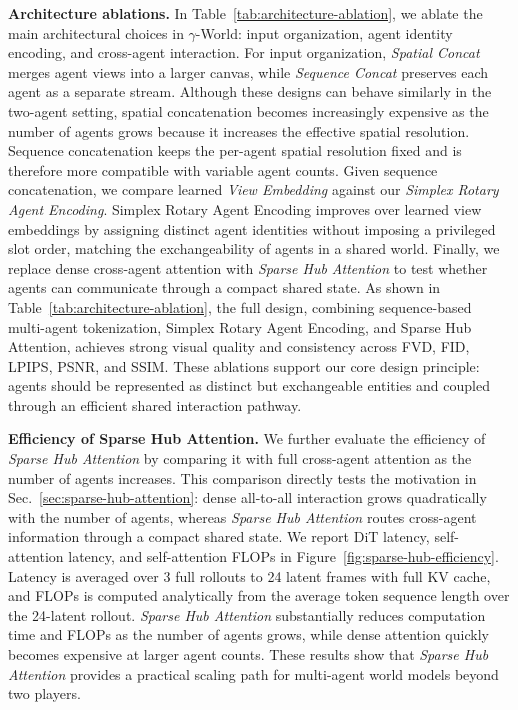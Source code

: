 \documentclass{llmxive}
\providecommand{\ours}{$\gamma$-World\xspace}
\begin{document}
\noindent\textbf{Architecture ablations.}
In Table~\ref{tab:architecture-ablation}, we ablate the main architectural choices in \ours: input organization, agent identity encoding, and cross-agent interaction.
For input organization, \emph{Spatial Concat} merges agent views into a larger canvas, while \emph{Sequence Concat} preserves each agent as a separate stream.
Although these designs can behave similarly in the two-agent setting, spatial concatenation becomes increasingly expensive as the number of agents grows because it increases the effective spatial resolution.
Sequence concatenation keeps the per-agent spatial resolution fixed and is therefore more compatible with variable agent counts.
Given sequence concatenation, we compare learned \emph{View Embedding} against our \emph{Simplex Rotary Agent Encoding}.
Simplex Rotary Agent Encoding improves over learned view embeddings by assigning distinct agent identities without imposing a privileged slot order, matching the exchangeability of agents in a shared world.
Finally, we replace dense cross-agent attention with \emph{Sparse Hub Attention} to test whether agents can communicate through a compact shared state.
As shown in Table~\ref{tab:architecture-ablation}, the full design, combining sequence-based multi-agent tokenization, Simplex Rotary Agent Encoding, and Sparse Hub Attention, achieves strong visual quality and consistency across FVD, FID, LPIPS, PSNR, and SSIM.
These ablations support our core design principle: agents should be represented as distinct but exchangeable entities and coupled through an efficient shared interaction pathway.



\noindent\textbf{Efficiency of Sparse Hub Attention.}
We further evaluate the efficiency of \emph{Sparse Hub Attention} by comparing it with full cross-agent attention as the number of agents increases.
This comparison directly tests the motivation in Sec.~\ref{sec:sparse-hub-attention}: dense all-to-all interaction grows quadratically with the number of agents, whereas \emph{Sparse Hub Attention} routes cross-agent information through a compact shared state.
We report DiT latency, self-attention latency, and self-attention FLOPs in Figure~\ref{fig:sparse-hub-efficiency}. Latency is averaged over 3 full rollouts to 24 latent frames with full KV cache, and FLOPs is computed analytically from the average token sequence length over the 24-latent rollout.
\emph{Sparse Hub Attention} substantially reduces computation time and FLOPs as the number of agents grows, while dense attention quickly becomes expensive at larger agent counts.
These results show that \emph{Sparse Hub Attention} provides a practical scaling path for multi-agent world models beyond two players.
\end{document}
